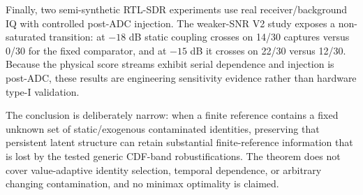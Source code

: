 Finally, two semi-synthetic RTL-SDR experiments use real receiver/background IQ with controlled post-ADC injection. The weaker-SNR V2 study exposes a non-saturated transition: at \(-18\) dB static coupling crosses on 14/30 captures versus 0/30 for the fixed comparator, and at \(-15\) dB it crosses on 22/30 versus 12/30. Because the physical score streams exhibit serial dependence and injection is post-ADC, these results are engineering sensitivity evidence rather than hardware type-I validation.

The conclusion is deliberately narrow: when a finite reference contains a fixed unknown set of static/exogenous contaminated identities, preserving that persistent latent structure can retain substantial finite-reference information that is lost by the tested generic CDF-band robustifications. The theorem does not cover value-adaptive identity selection, temporal dependence, or arbitrary changing contamination, and no minimax optimality is claimed.
